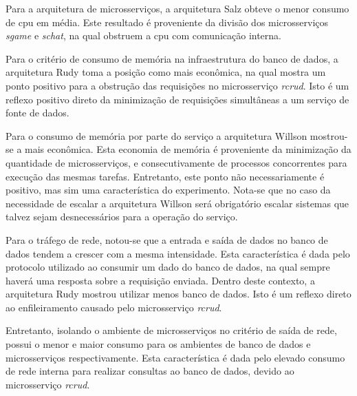 Para a arquitetura de microsserviços, a arquitetura Salz obteve o menor consumo de \ac{cpu} em média.
%
Este resultado é proveniente da divisão dos microsserviços \textit{sgame} e \textit{schat}, na qual obstruem a \ac{cpu} com comunicação interna.

Para o critério de consumo de memória na infraestrutura do banco de dados, a arquitetura Rudy toma a posição como mais econômica, na qual mostra um ponto positivo para a obstrução das requisições no microsserviço \textit{rcrud}.
%
Isto é um reflexo positivo direto da minimização de requisições simultâneas a um serviço de fonte de dados.


Para o consumo de memória por parte do serviço a arquitetura Willson mostrou-se a mais econômica.
%
Esta economia de memória é proveniente da minimização da quantidade de microsserviços, e consecutivamente de processos concorrentes para execução das mesmas tarefas.
%
Entretanto, este ponto não necessariamente é positivo, mas sim uma característica do experimento.
Nota-se que no caso da necessidade de escalar a arquitetura Willson será obrigatório escalar sistemas que talvez sejam desnecessários para a operação do serviço.

Para o tráfego de rede, notou-se que a entrada e saída de dados no banco de dados tendem a crescer com a mesma intensidade.
%
Esta característica é dada pelo protocolo utilizado ao consumir um dado do banco de dados, na qual sempre haverá uma resposta sobre a requisição enviada.
%
Dentro deste contexto, a arquitetura Rudy mostrou utilizar menos banco de dados.
%
Isto é um reflexo direto ao enfileiramento causado pelo microsserviço \textit{rcrud}.

Entretanto, isolando o ambiente de microsserviços no critério de saída de rede, possui o menor e maior consumo para os ambientes de banco de dados e microsserviços respectivamente.
%
Esta característica é dada pelo elevado consumo de rede interna para realizar consultas ao banco de dados, devido ao microsserviço \textit{rcrud}.
